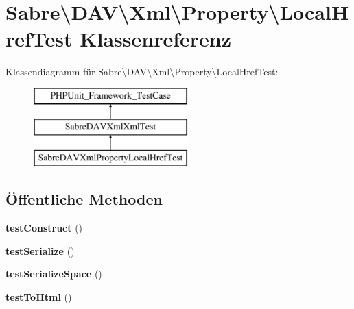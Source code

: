 \hypertarget{class_sabre_1_1_d_a_v_1_1_xml_1_1_property_1_1_local_href_test}{}\section{Sabre\textbackslash{}D\+AV\textbackslash{}Xml\textbackslash{}Property\textbackslash{}Local\+Href\+Test Klassenreferenz}
\label{class_sabre_1_1_d_a_v_1_1_xml_1_1_property_1_1_local_href_test}
Klassendiagramm für Sabre\textbackslash{}D\+AV\textbackslash{}Xml\textbackslash{}Property\textbackslash{}Local\+Href\+Test\+:\begin{figure}[H]
\begin{center}
\leavevmode
\includegraphics[height=3.000000cm]{class_sabre_1_1_d_a_v_1_1_xml_1_1_property_1_1_local_href_test}
\end{center}
\end{figure}
\subsection*{Öffentliche Methoden}
\begin{DoxyCompactItemize}
\item 
\mbox{\label{class_sabre_1_1_d_a_v_1_1_xml_1_1_property_1_1_local_href_test_a08da6844e777f124adfe16d834b26063}} 
{\bfseries test\+Construct} ()
\item 
\mbox{\label{class_sabre_1_1_d_a_v_1_1_xml_1_1_property_1_1_local_href_test_a10965392e9d6fcf588983d50e0c3804d}} 
{\bfseries test\+Serialize} ()
\item 
\mbox{\label{class_sabre_1_1_d_a_v_1_1_xml_1_1_property_1_1_local_href_test_a24654b12e34e96df129eb89de46205ba}} 
{\bfseries test\+Serialize\+Space} ()
\item 
\mbox{\label{class_sabre_1_1_d_a_v_1_1_xml_1_1_property_1_1_local_href_test_a9f890a879fccdb8cf75b457f5e116426}} 
{\bfseries test\+To\+Html} ()
\end{DoxyCompactItemize}
